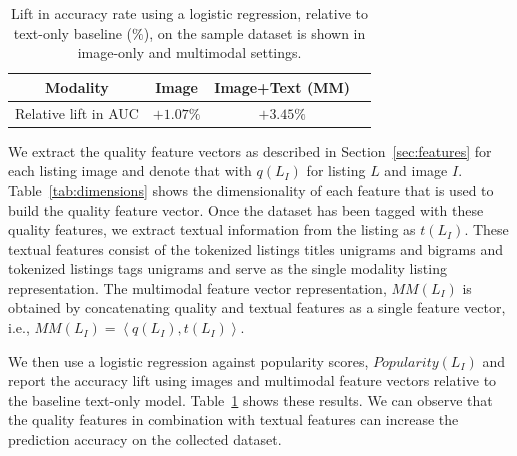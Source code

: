 \documentclass[conference,a4paper]{IEEEtran}
\begin{document}
\begin{table}[h!]
   \label{tab:results}
   \caption{Lift in accuracy rate using a logistic regression, relative to text-only baseline ($\%$), on the sample dataset is shown in image-only and multimodal settings.}
    \begin{center}
\begin{tabular}{|c||c|c|c|} 
\hline
Modality&Image&Image+Text (MM)\\
\hline
 \hline
Relative lift in AUC& $+1.07\%$ &$+\mathbf{3.45}\%$\\ \hline
 \end{tabular}
 \label{tab:results}
   \end{center}
\end{table}


\newcommand{\tuple}[1]{\ensuremath{\left \langle #1 \right \rangle }}


We extract the quality feature vectors as described in Section~\ref{sec:features} for each listing image and denote that with $q(L_I)$ for listing $L$ and image $I$. Table~\ref{tab:dimensions} shows the dimensionality of each feature that is used to build the quality feature vector. Once the dataset has been tagged with these quality features, we extract textual information from the
listing as $t(L_I)$. These textual features consist of the tokenized listings
titles unigrams and bigrams and tokenized listings
tags unigrams and serve as the single modality listing representation. The multimodal feature vector representation, $MM(L_I)$ is obtained by concatenating quality and textual features as a single feature vector, i.e., $MM(L_I) = \tuple{q(L_I),t(L_I)}$. 

We then use a logistic regression against popularity scores, $Popularity(L_I)$ 
and report the accuracy lift using images and multimodal feature vectors relative to the baseline text-only model. Table~\ref{tab:results} shows these results. We can observe that the quality features in combination with textual features can increase the prediction accuracy on the collected dataset.  
\end{document}
